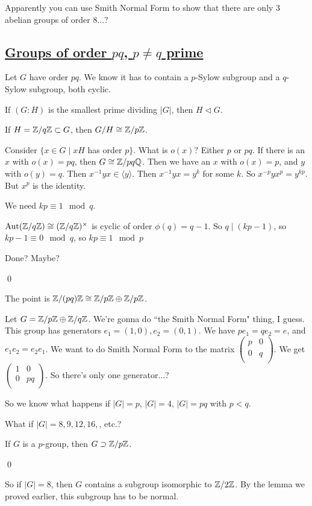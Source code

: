 \documentclass[x11names,reqno,14pt]{extarticle}
\begin{document}
Apparently you can use Smith Normal Form to show that there are only 3 abelian groups of order 8...?

\subsection*{\underline{Groups of order $pq$, $p \neq q$ prime}}

Let $G$ have order $pq$. We know it has to contain a $p$-Sylow subgroup and a $q$-Sylow subgroup, both cyclic. 

\lem

If $(G:H)$ is the smallest prime dividing $|G|$, then $H\lhd G$. 

\proof

If $H = \mathbb{Z}/q\mathbb{Z} \subset G$, then $G/H \cong \mathbb{Z}/p\mathbb{Z}$. 

Consider $\{x \in G \mid xH$ has order $p\}$. What is $o(x)?$ Either $p$ or $pq$. If there is an $x$ with $o(x) = pq$, then $G \cong \mathbb{Z}/pq\mathbb{Q}$. Then we have an $x$ with $o(x) = p$, and $y$ with $o(y) = q$. Then $x^{-1}yx \in \langle y \rangle$. Then $x^{-1}yx = y^k$ for some $k$. So $x^{-p}yx^p = y^{kp}$. But $x^p$ is the identity. 

We need $kp \equiv 1\mod q$. 

${\mathrm{Aut}}(\mathbb{Z}/q\mathbb{Z}) \cong (\mathbb{Z}/q\mathbb{Z})^\times$ is cyclic of order $\phi(q) = q - 1$. So $q \mid (kp - 1 )$, so $kp - 1 \equiv 0 \mod q$, so $kp \equiv 1 \mod p$

Done? Maybe?

\qed

The point is $\mathbb{Z}/(pq)\mathbb{Z} \cong \mathbb{Z}/p\mathbb{Z} \oplus\mathbb{Z}/p\mathbb{Z}$. 

Let $G = \mathbb{Z}/p\mathbb{Z} \oplus\mathbb{Z}/q\mathbb{Z}$. We're gonna do ``the Smith Normal Form" thing, I guess. This group has generators $e_1 =(1, 0), e_2 = (0, 1)$. We have $pe_1 = qe_2 = e$, and $e_1e_2 = e_2e_1$. We want to do Smith Normal Form to the matrix $\begin{pmatrix} p & 0 \\ 0 & q \\ \end{pmatrix}$. We get $\begin{pmatrix} 1 & 0 \\ 0 & pq \\ \end{pmatrix}$. So there's only one generator...?

So we know what happens if $|G| = p$, $|G| = 4$, $|G| = pq$ with $p < q$. 

What if $|G| = 8,9,12,16,$, etc.? 

\lem

If $G$ is a $p$-group, then $G \supset\mathbb{Z}/p\mathbb{Z}$. 

\qed

So if $|G| = 8$, then $G$ contains a subgroup isomorphic to $\mathbb{Z}/2\mathbb{Z}$. By the lemma we proved earlier, this subgroup has to be normal. 
\end{document}
